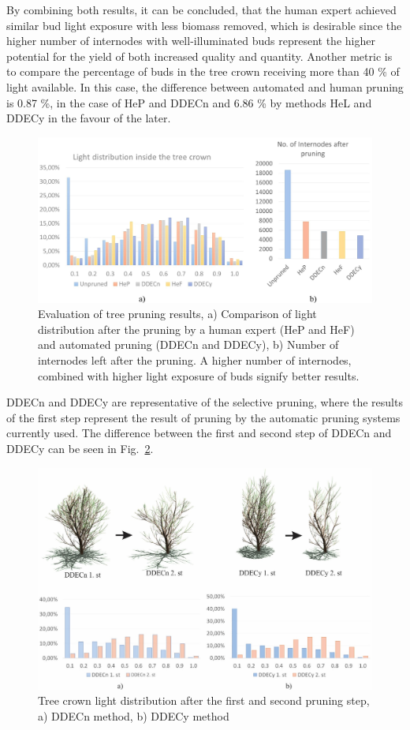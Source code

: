 By combining both results, it can be concluded, that the human expert
achieved similar bud light exposure with less biomass removed,
which is desirable since the higher number of internodes with
well-illuminated buds represent the higher potential for the yield of
both increased quality and quantity. Another metric is to compare the
percentage of buds in the tree crown receiving more than 40 \% of light
available. In this case, the difference between automated and human
pruning is 0.87 \%, in the case of HeP and DDECn and 6.86 \% by methods HeL and DDECy in the favour of the later.

\begin{figure}[hbt]
    \centering
    \includegraphics[width=5in]{figs/image5.jpeg}
    \caption{Evaluation of tree pruning results, a) Comparison of
light distribution after the pruning by a human expert (HeP and HeF) and
automated pruning (DDECn and DDECy), b) Number of internodes left after
the pruning. A higher number of internodes, combined with higher light
exposure of buds signify better results.}
\label{fig:my_figure5}
\end{figure}

DDECn and DDECy are representative of the selective pruning, where the
results of the first step represent the result of pruning by the
automatic pruning systems currently used. The difference between the
first and second step of DDECn and DDECy can be seen in Fig.~\ref{fig:my_figure6}.

\begin{figure}[hbt]
    \centering
    \includegraphics[width=5.4in]{figs/image6.jpeg}
    \caption{Tree crown light distribution after the first and
second pruning step, a) DDECn method, b) DDECy method}
    \label{fig:my_figure6}
\end{figure}

